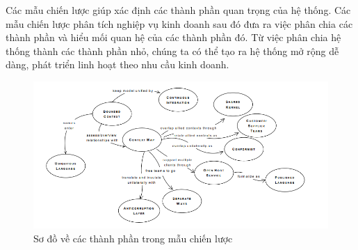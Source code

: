 Các mẫu chiến lược giúp xác định các thành phần quan trọng của hệ thống. Các mẫu chiến lược phân tích nghiệp vụ kinh doanh sau đó đưa ra việc phân chia các thành phần và hiểu mối quan hệ của các thành phần đó. Từ việc phân chia hệ thống thành các thành phần nhỏ, chúng ta có thể tạo ra hệ thống mở rộng dễ dàng, phát triển linh hoạt theo nhu cầu kinh doanh.























\begin{figure}[H]

\centering

\includegraphics[scale = 0.9]{pictures/cac_mau_chien_luoc/temp.png}

\caption{Sơ đồ về các thành phần trong mẫu chiến lược}

\end{figure}

